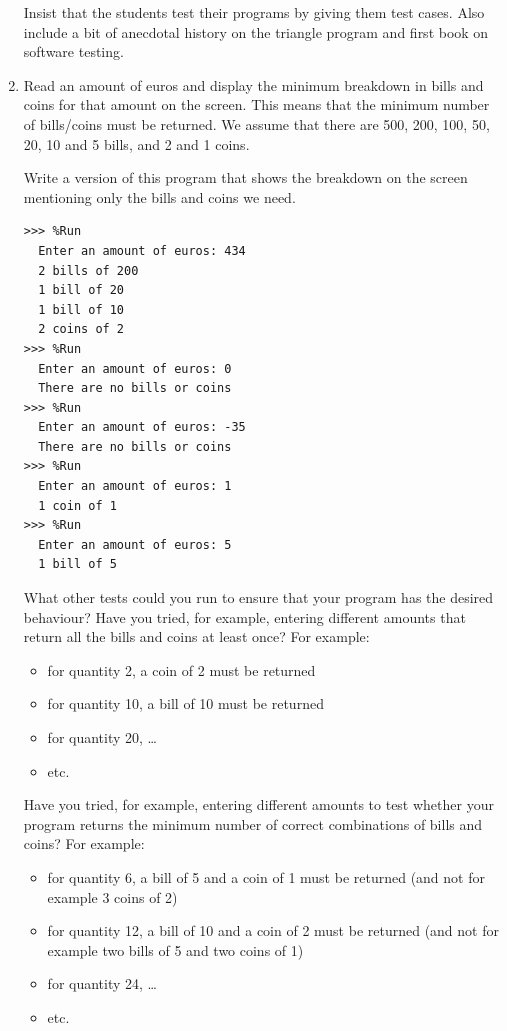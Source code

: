 \documentclass[
  fontsize=10pt,
  a4paper,
]{scrartcl}
\newenvironment{howTILEd}%
  {\begin{mdframed}[skipabove=10pt,skipbelow=10pt,backgroundcolor=pink!40]}%
  {\end{mdframed}}
\begin{document}
\begin{enumerate}
\begin{howTILEd}
Insist that the students test their programs by giving them test cases. Also include a bit of anecdotal history on the triangle program and first book on software testing.
\end{howTILEd}


\item Read an amount of euros and display the minimum breakdown in bills and coins for that amount on the screen. This means that the minimum number of bills/coins must be returned. We assume that there are 500, 200, 100, 50, 20, 10 and 5 bills, and 2 and 1 coins.

Write a version of this program that shows the breakdown on the screen mentioning only the bills and coins we need.

\begin{small}
\begin{Verbatim}[frame=single, label={\em examples of test executions}]
>>> %Run 
  Enter an amount of euros: 434
  2 bills of 200
  1 bill of 20
  1 bill of 10
  2 coins of 2
>>> %Run 
  Enter an amount of euros: 0
  There are no bills or coins
>>> %Run 
  Enter an amount of euros: -35
  There are no bills or coins
>>> %Run 
  Enter an amount of euros: 1
  1 coin of 1
>>> %Run 
  Enter an amount of euros: 5
  1 bill of 5
\end{Verbatim}
\end{small}

What other tests could you run to ensure that your program has the desired behaviour? Have you tried, for example, entering different amounts that return all the bills and coins at least once? For example:

\begin{itemize}
    \item for quantity 2, a coin of 2 must be returned
    \item for quantity 10, a bill of 10 must be returned 
    \item for quantity 20, \dots
    \item etc.
\end{itemize}


Have you tried, for example, entering different amounts to test whether your program returns the minimum number of correct combinations of bills and coins? For example:

\begin{itemize}
    \item for quantity 6, a bill of 5 and a coin of 1 must be returned (and not for example 3 coins of 2)
     \item for quantity 12, a bill of 10 and a coin of 2 must be returned (and not for example two bills of 5 and two coins of 1)
     \item for quantity 24, \dots
     \item etc.
\end{itemize}



\end{enumerate}
\end{document}
